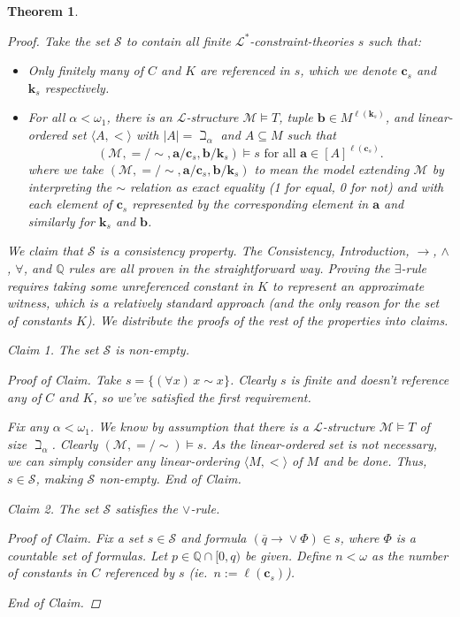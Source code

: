\documentclass{amsart}
\newtheorem{theorem}{Theorem}[section]
\theoremstyle{definition}
\numberwithin{equation}{theorem}
\newcommand{\Q}{\mathbb{Q}}
\newcommand{\V}{\mathbf}
\newcommand{\unvee}{{\vee}}
\newcommand{\rat}[1]{{\overline{#1}}}
\newcommand{\narrow}[1]{\xrightarrow{#1}}
\renewcommand{\to}{\narrow{}}
\newcommand{\len}{\ell}
\newcommand{\frag}{\mathcal{L}}
\newenvironment{claim}[1]{\vspace{.07in}\par\noindent\emph{Claim #1.}\space}{}
\newenvironment{claimproof}{\vspace{.07in}\par\noindent\emph{Proof of Claim.}\space}{\hfill \emph{End of Claim.}}
\begin{document}
\begin{theorem}
\begin{proof}
    Take the set $\mathscr{S}$ to contain all finite $\frag^*$-constraint-theories $s$ such that:
    \begin{itemize}
    \item Only finitely many of $C$ and $K$ are referenced in $s$, which we denote $\V c_s$ and $\V k_s$ respectively.
    \item For all $\alpha<\omega_1$, there is an $\frag$-structure $\mathcal M\models T$, tuple $\V b\in M^{\len(\V k_s)}$, and linear-ordered set $\langle A,<\rangle$ with $|A|=\beth_\alpha$ and $A\subseteq M$ such that 
    \[
      (\mathcal M,{=}/{\sim},\V a/\V c_s, \V b/\V k_s)\models s\text{ for all $\V a\in[A]^{\len(\V c_s)}$}.
    \]
    where we take $(\mathcal M,{=}/{\sim},\V a/\V c_s,\V b/\V k_s)$ to mean the model extending $\mathcal M$ by interpreting the $\sim$ relation as exact equality (1 for equal, 0 for not) and with each element of $\V c_s$ represented by the corresponding element in $\V a$ and similarly for $\V k_s$ and $\V b$.
    \end{itemize}
    We claim that $\mathscr{S}$ is a consistency property.
    The Consistency, Introduction, $\rightarrow$, $\wedge$, $\forall$, and $\Q$ rules are all proven in the straightforward way.
    Proving the $\exists$-rule requires taking some unreferenced constant in $K$ to represent an approximate witness, which is a relatively standard approach (and the only reason for the set of constants $K$).
    We distribute the proofs of the rest of the properties into claims.
    \begin{claim}{1}
      The set $\mathscr{S}$ is non-empty.
      \begin{claimproof}
        Take $s=\{(\forall x)\,x\sim x\}$.
        Clearly $s$ is finite and doesn't reference any of $C$ and $K$, so we've satisfied the first requirement.
        
        Fix any $\alpha<\omega_1$.
        We know by assumption that there is a $\frag$-structure $\mathcal M\models T$ of size $\beth_\alpha$.
        Clearly $(\mathcal M,{=}/{\sim})\models s$.
        As the linear-ordered set is not necessary, we can simply consider any linear-ordering $\langle M,<\rangle$ of $M$ and be done.
        Thus, $s\in \mathscr{S}$, making $\mathscr{S}$ non-empty.
      \end{claimproof}
    \end{claim}
    \begin{claim}{2}
      The set $\mathscr{S}$ satisfies the $\vee$-rule.
      \begin{claimproof}
        Fix a set $s\in \mathscr{S}$ and formula $(\rat q\to\unvee\Phi)\in s$, where $\Phi$ is a countable set of formulas.
        Let $p\in\Q\cap[0,q)$ be given.
        Define $n<\omega$ as the number of constants in $C$ referenced by $s$ (ie.\ $n:=\len(\V c_s)$).
        

\end{claimproof}
\end{claim}
\end{proof}
\end{theorem}
\end{document}
